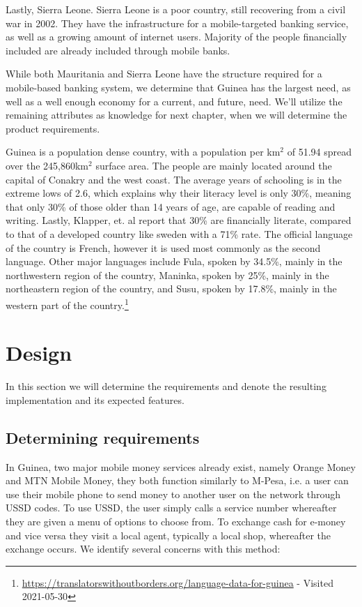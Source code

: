 \documentclass[11pt, a4paper]{article}
\begin{document}
Lastly, Sierra Leone. Sierra Leone is a poor country, still recovering from a civil war in 2002. They have the infrastructure for a mobile-targeted banking service, as well as a growing amount of internet users. Majority of the people financially included are already included through mobile banks.

While both Mauritania and Sierra Leone have the structure required for a mobile-based banking system, we determine that Guinea has the largest need, as well as a well enough economy for a current, and future, need. We'll utilize the remaining attributes as knowledge for next chapter, when we will determine the product requirements.

Guinea is a population dense country, with a population per km$^2$ of 51.94\cite{wbdata} spread over the 245,860km$^2$ surface area. The people are mainly located around the capital of Conakry and the west coast. The average years of schooling is in the extreme lows of 2.6\cite{owidliteracy}, which explains why their literacy level is only 30\%, meaning that only 30\% of those older than 14 years of age, are capable of reading and writing\cite{owidliteracy}. Lastly, Klapper, et. al\cite{Klfin} report that 30\% are financially literate, compared to that of a developed country like sweden with a 71\% rate. The official language of the country is French, however it is used most commonly as the second language. Other major languages include Fula, spoken by 34.5\%, mainly in the northwestern region of the country, Maninka, spoken by 25\%, mainly in the northeastern region of the country, and Susu, spoken by 17.8\%, mainly in the western part of the country.\footnote{\label{lang} \url{https://translatorswithoutborders.org/language-data-for-guinea} - Visited 2021-05-30}



\section{Design}
In this section we will determine the requirements and denote the resulting implementation and its expected features.

\subsection{Determining requirements}
In Guinea, two major mobile money services already exist, namely Orange Money and MTN Mobile Money, they both function similarly to M-Pesa, i.e. a user can use their mobile phone to send money to another user on the network through USSD codes. To use USSD, the user simply calls a service number whereafter they are given a menu of options to choose from. To exchange cash for e-money and vice versa they visit a local agent, typically a local shop, whereafter the exchange occurs. We identify several concerns with this method:
\end{document}
